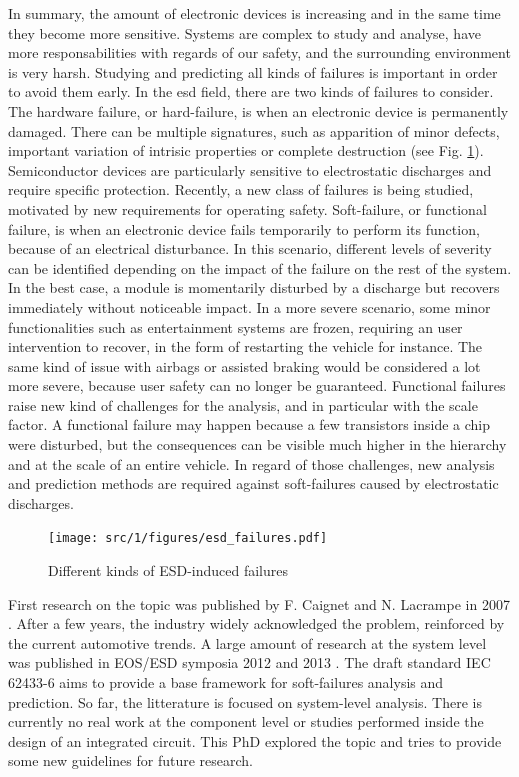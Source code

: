 In summary, the amount of electronic devices is increasing and in the same time they become more sensitive.
Systems are complex to study and analyse, have more responsabilities with regards of our safety, and the surrounding environment is very harsh.
Studying and predicting all kinds of failures is important in order to avoid them early.
In the \gls{esd} field, there are two kinds of failures to consider.
The hardware failure, or hard-failure, is when an electronic device is permanently damaged.
There can be multiple signatures, such as apparition of minor defects, important variation of intrisic properties or complete destruction (see Fig. \ref{fig:esd-failures}).
Semiconductor devices are particularly sensitive to electrostatic discharges \cite{impactESDsemiconductors} and require specific protection.
Recently, a new class of failures is being studied, motivated by new requirements for operating safety.
Soft-failure, or functional failure, is when an electronic device fails temporarily to perform its function, because of an electrical disturbance.
In this scenario, different levels of severity can be identified depending on the impact of the failure on the rest of the system.
In the best case, a module is momentarily disturbed by a discharge but recovers immediately without noticeable impact.
In a more severe scenario, some minor functionalities such as entertainment systems are frozen, requiring an user intervention to recover, in the form of restarting the vehicle for instance.
The same kind of issue with airbags or assisted braking would be considered a lot more severe, because user safety can no longer be guaranteed.
Functional failures raise new kind of challenges for the analysis, and in particular with the scale factor.
A functional failure may happen because a few transistors inside a chip were disturbed, but the consequences can be visible much higher in the hierarchy and at the scale of an entire vehicle.
In regard of those challenges, new analysis and prediction methods are required against soft-failures caused by electrostatic discharges.

\begin{figure}[!h]
  \centering
  \texttt{[image: src/1/figures/esd\_failures.pdf]}
  \caption{Different kinds of ESD-induced failures}
  \label{fig:esd-failures}
\end{figure}

First research on the topic was published by F. Caignet and N. Lacrampe in 2007 \cite{}.
After a few years, the industry widely acknowledged the problem, reinforced by the current automotive trends.
A large amount of research at the system level was published in EOS/ESD symposia 2012 \cite{} and 2013 \cite{}.
The draft standard IEC 62433-6 aims to provide a base framework for soft-failures analysis and prediction.
So far, the litterature is focused on system-level analysis.
There is currently no real work at the component level or studies performed inside the design of an integrated circuit.
This PhD explored the topic and tries to provide some new guidelines for future research.


